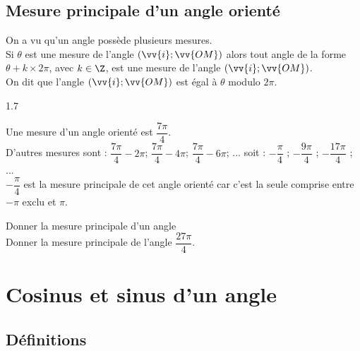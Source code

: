         
        
            
        
    \subsection{Mesure principale d'un angle orienté }
    
        On a vu qu'un angle possède plusieurs mesures.\\
        Si $\theta$ est une mesure de l'angle  $(\vv{i}  ;\vv{OM} )$ alors tout angle de la forme $\theta+k\times2\pi$, avec $k\in \Z$, est une mesure de l'angle $(\vv{i}  ;\vv{OM} )$.\\
        On dit que l'angle $(\vv{i}  ;\vv{OM} )$ est égal à $\theta$ modulo $2\pi$.
        \begin{spacing}{1.7}
        \begin{bdefi}
            \pointille[\textwidth]
            \pointille[\textwidth]
        \end{bdefi}
    	\end{spacing}
        
        \begin{bexemple}
            Une mesure d'un angle orienté est $\dfrac{7\pi}{4}$.\\
            D'autres mesures sont : $\dfrac{7\pi}{4}-2\pi$; $\dfrac{7\pi}{4}-4\pi$; $\dfrac{7\pi}{4}-6\pi$; ... soit : $-\dfrac{\pi}{4}$ ; $-\dfrac{9\pi}{4}$ ; $-\dfrac{17\pi}{4}$ ; ...\\
            $-\dfrac{\pi}{4}$ est la mesure principale de cet angle orienté car c'est la seule comprise entre $-\pi$ exclu et $\pi$.
        \end{bexemple}
        
        \begin{bmethodet}{Donner la mesure principale d'un angle}
            \\
            Donner la mesure principale de l'angle $\dfrac{27\pi}{4}$.\\ 
        \end{bmethodet}
\vspace{-1cm}
\section{Cosinus et sinus d'un angle}
    \subsection{Définitions}
    
